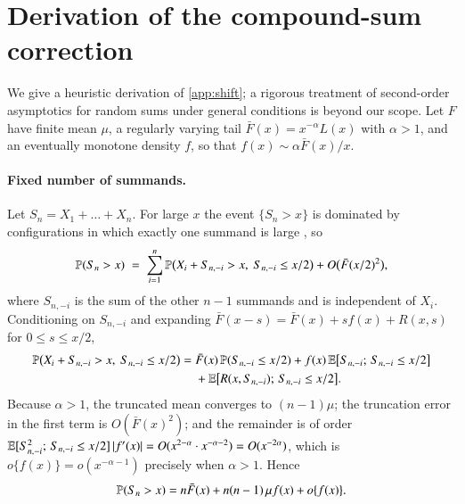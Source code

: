 \section{Derivation of the compound-sum correction}\label{app:derivation}

We give a heuristic derivation of \cref{app:shift}; a rigorous treatment of second-order asymptotics for random sums under general conditions is beyond our scope. Let $F$ have finite mean $\mu$, a regularly varying tail $\bar F(x) = x^{-\alpha}L(x)$ with $\alpha > 1$, and an eventually monotone density $f$, so that $f(x) \sim \alpha \bar F(x)/x$.

\paragraph{Fixed number of summands.} Let $S_n = X_1 + \dots + X_n$. For large $x$ the event $\{S_n > x\}$ is dominated by configurations in which exactly one summand is large \citep[Section~1.3]{embrechts1997}, so
\[
\mathbb{P}(S_n > x) \;=\; \sum_{i=1}^{n} \mathbb{P}\big(X_i + S_{n,-i} > x,\ S_{n,-i} \le x/2\big) + O\big(\bar F(x/2)^2\big),
\]
where $S_{n,-i}$ is the sum of the other $n-1$ summands and is independent of $X_i$. Conditioning on $S_{n,-i}$ and expanding $\bar F(x - s) = \bar F(x) + s f(x) + R(x,s)$ for $0 \le s \le x/2$,
\[
\begin{aligned}
\mathbb{P}\big(X_i + S_{n,-i} > x,\ S_{n,-i} \le x/2\big) ={}& \bar F(x)\,\mathbb{P}(S_{n,-i}\le x/2) + f(x)\,\mathbb{E}\big[S_{n,-i};\, S_{n,-i}\le x/2\big]\\
&+ \mathbb{E}\big[R(x,S_{n,-i});\, S_{n,-i}\le x/2\big].
\end{aligned}
\]
Because $\alpha>1$, the truncated mean converges to $(n-1)\mu$; the truncation error in the first term is $O(\bar F(x)^2)$; and the remainder is of order $\mathbb{E}[S_{n,-i}^2;\, S_{n,-i}\le x/2]\,|f'(x)| = O(x^{2-\alpha}\cdot x^{-\alpha-2}) = O(x^{-2\alpha})$, which is $o\{f(x)\} = o(x^{-\alpha-1})$ precisely when $\alpha > 1$. Hence
\[
\mathbb{P}(S_n > x) = n\bar F(x) + n(n-1)\,\mu f(x) + o\{f(x)\}.
\]

